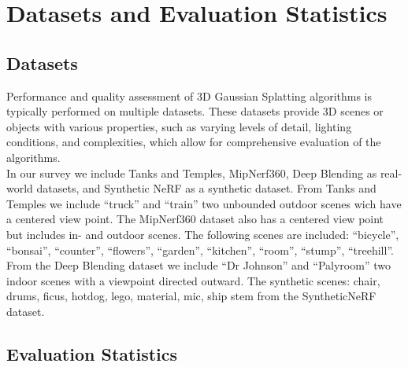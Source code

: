 \section{Datasets and Evaluation Statistics}

\subsection{Datasets}
Performance and quality assessment of 3D Gaussian Splatting algorithms is typically performed on multiple datasets. These datasets provide 3D scenes or objects with various properties, such as varying levels of detail, lighting conditions, and complexities, which allow for comprehensive evaluation of the algorithms. \\
In our survey we include Tanks and Temples\cite{TanksAndTemples}, MipNerf360\cite{MipNeRF360}, Deep Blending\cite{DeepBlending} as real-world datasets, and Synthetic NeRF\cite{SyntheticNeRF} as a synthetic dataset. From Tanks and Temples we include ``truck'' and ``train'' two unbounded outdoor scenes wich have a centered view point. The MipNerf360 dataset also has a centered view point but includes in- and outdoor scenes. The following scenes are included:  ``bicycle'', ``bonsai'', ``counter'', ``flowers'', ``garden'', ``kitchen'', ``room'', ``stump'', ``treehill''. From the Deep Blending dataset we include ``Dr Johnson'' and ``Palyroom'' two indoor scenes with a viewpoint directed outward. The synthetic scenes: chair, drums, ficus, hotdog, lego, material, mic, ship stem from the SyntheticNeRF dataset.

\subsection{Evaluation Statistics}
